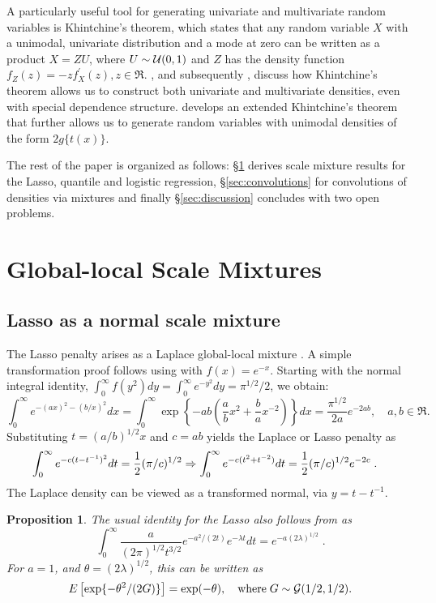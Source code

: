 \documentclass[11pt]{article}
\newtheorem{proposition}[theorem]{Proposition}
\begin{document}
A particularly useful tool for generating univariate and multivariate random variables is Khintchine's theorem, which states that any random variable $X$ with a unimodal, univariate distribution and a mode at zero can be written as a product $X = Z U$, where $U \sim \mathcal{U}(0,1)$ and $Z$ has the density function $f_Z(z) = -z f^{\prime}_{X}(z), z \in \Re$. \citet{bryson1982constructing}, and subsequently \citet{jones2012khintchine}, discuss how Khintchine's theorem allows us to construct both univariate and multivariate densities, even with special dependence structure. \citet{jones_generating_2014} develops an extended Khintchine's theorem that further allows us to generate random variables with unimodal densities of the form $2 g\{t(x)\}$. 

The rest of the paper is organized as follows: \S\ref{sec:gls_mixes} derives scale mixture results for the Lasso, quantile and logistic regression, \S\ref{sec:convolutions} for convolutions of densities via mixtures and finally \S\ref{sec:discussion} concludes with two open problems.

\section{Global-local Scale Mixtures}
\label{sec:gls_mixes}
\subsection{Lasso as a normal scale mixture}

The Lasso penalty arises as a Laplace global-local mixture \citep{andrews_scale_1974}.  A simple transformation proof follows using \CS{} with $f(x) = e^{-x}$.  Starting with the normal integral identity, $\int_{0}^{\infty} f(y^2) dy = \int_0^\infty e^{-y^2} dy = \pi^{1/2}/2 $, we obtain:
\[
\int_0^\infty e^{-(a x)^2 - (b/x)^2} d x = \int_0^{\infty}\exp\left\{-a b \left(\frac{a}{b} x^2 + \frac{b}{a} x^{-2} \right)\right\} dx = \frac{\pi^{1/2}}{2a} e^{-2 a b}, \quad a,b \in \Re.
\]
Substituting $t = (a/b)^{1/2} x$ and $c = ab$ yields the Laplace or Lasso penalty as
\begin{align*}
  \int_0^\infty e^{- c (t - t^{-1})^2} dt &= \frac{1}{2} (\pi/c)^{1/2} \Rightarrow \int_0^\infty e^{- c (t^2 + t^{-2})} dt  = \frac{1}{2} (\pi/c)^{1/2} e^{-2c}\;. 
\end{align*}
The Laplace density can be viewed as a transformed normal, via $y = t - t^{-1}$.

\begin{proposition}
The usual identity for the Lasso also follows from \citet{levy1940certains} as
\begin{equation}
  \int_{0}^{\infty} \frac{a}{(2 \pi)^{1/2} t^{3/2}} e^{-{a^2}/({2 t})} e^{-\lambda t} dt = e^{-a (2 \lambda)^{1/2} } \;.\label{eq:levy}
\end{equation}
For $a = 1$, and $\theta = (2 \lambda)^{1/2}$, this can be written as 
\begin{equation}
  E \left[ \exp\{-\theta^2/(2G)\} \right] = \exp(-\theta),\quad \mbox{where} \; G \sim \mathcal{G}(1/2, 1/2).
  \label{eq:gamma}
\end{equation}
\end{proposition}
\end{document}
